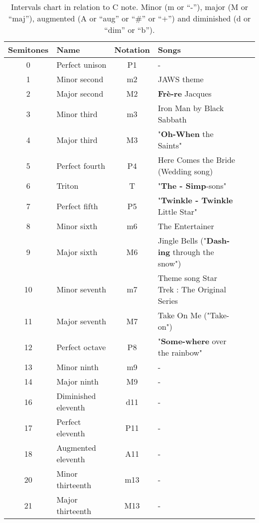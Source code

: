 \begin{table*}[!h]
	\caption{Intervals chart in relation to C note. Minor (m or ``-''), major (M or ``maj''), augmented (A or ``aug'' or ``$\#$'' or ``$+$'') and diminished (d or ``dim'' or ``b''). }
	\centering
	\begin{adjustwidth}{-2cm}{}
	\begin{tabular}{clclcl}
		\hline 
		\textbf{Semitones} & \textbf{Name} & \textbf{Notation} & \textbf{Songs}  \\
		\hline
		0 & Perfect unison            & P1 & -   \\
		\hline
		1 & Minor second              & m2 & JAWS theme \\
		2 & Major second              & M2 & \textbf{Frè-re} Jacques  \\
		\hline
		3 & Minor third               & m3 & Iron Man by Black Sabbath\\
		4 & Major third               & M3 & "\textbf{Oh-When} the Saints" \\
		\hline
		5 & Perfect fourth            & P4 & Here Comes the Bride (Wedding song) \\
		\hline
		6 & Triton                    & T  & "\textbf{The - Simp}-sons" \\ 
		\hline
		7 & Perfect fifth             & P5 &  "\textbf{Twinkle - Twinkle} Little Star"   \\
		\hline
		8 & Minor sixth               & m6 &  The Entertainer \\
		9 & Major sixth               & M6 &  Jingle Bells ("\textbf{Dash-ing} through the snow")   \\
		\hline
		10 & Minor seventh            & m7 &  Theme song Star Trek : The Original Series\\
		11 & Major seventh            & M7 &  Take On Me ("Take-on")  \\
		\hline
		12 & Perfect octave           & P8 &  "\textbf{Some-where} over the rainbow" \\
		\hline
		13 & Minor ninth              & m9 &  - \\
		14 & Major ninth              & M9 &  - \\
		\hline
		16 & Diminished eleventh      & d11 & - \\
		17 & Perfect eleventh         & P11 & - \\
		18 & Augmented eleventh       & A11 & - \\
		\hline
		20 & Minor thirteenth         & m13 & - \\
		21 & Major thirteenth         & M13 & - \\
		\hline
	\end{tabular}
	\end{adjustwidth}
	\label{tab: }
\end{table*}